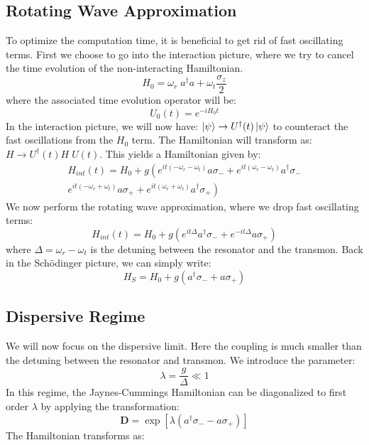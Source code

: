 \subsection{Rotating Wave Approximation}
To optimize the computation time, it is beneficial to get rid of fast oscillating terms. First we choose to go into the interaction picture, where we try to cancel the time evolution of the non-interacting Hamiltonian.
\begin{equation}
    H_0 = \omega_r \; a^\dagger a + \omega_t\frac{\sigma_z}{2} 
\end{equation}
where the associated time evolution operator will be:
\begin{equation}
    U_0(t) = e^{-iH_0t}
\end{equation}
In the interaction picture, we will now have: $\ket{\psi} \rightarrow U^\dagger(t)\ket{\psi}$ to counteract the fast oscillations from the $H_0$ term. The Hamiltonian will transform as: $H \rightarrow U^\dagger(t) H \; U(t)$. This yields a Hamiltonian given by:
\begin{align*}
    H_{int}(t) = H_0 + g \left(e^{it(-\omega_r - \omega_t)} a \sigma_- + e^{it(\omega_r - \omega_t)} a^\dagger \sigma_-\right.  \\ 
    \left.e^{it(-\omega_r + \omega_t)} a \sigma_+ + e^{it(\omega_r + \omega_t)} a^\dagger \sigma_+\right)
\end{align*}
We now perform the rotating wave approximation, where we drop fast oscillating terms:
\begin{equation}
    H_{int}(t) = H_0 + g \left(e^{it\Delta}a^\dagger\sigma_- +  e^{-it\Delta}a\sigma_+\right)
\end{equation}
where $\Delta = \omega_r - \omega_t$ is the detuning between the resonator and the transmon. Back in the Schödinger picture, we can simply write:
\begin{equation}
    H_{S} = H_0 + g \left(a^\dagger\sigma_- +  a\sigma_+\right)
\end{equation}

\subsection{Dispersive Regime}
We will now focus on the dispersive limit. Here the coupling is much smaller than the detuning between the resonator and transmon. We introduce the parameter:
\begin{equation}
    \lambda = \frac{g}{\Delta} \ll 1
\end{equation}
In this regime, the Jaynes-Cummings Hamiltonian can be diagonalized to first order $\lambda$ by applying the transformation:
\begin{equation}
    \boldsymbol{D} = \exp\left[\lambda (a^\dagger \sigma_- - a \sigma_+) \right]
\end{equation}
The Hamiltonian transforms as: 

